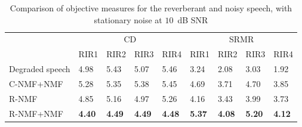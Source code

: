 \begin{table}[htb]
\centering
\caption{Comparison of objective measures for the reverberant and noisy speech, with stationary noise at $10$~dB SNR}
\label{tab:10dB}
\begin{tabular}{|l|l|l|l|l|l|l|l|l|}
\hline
\multirow{2}{*}{} & \multicolumn{4}{c|}{CD}                                       & \multicolumn{4}{c|}{SRMR}                                     \\ \cline{2-9} 
                  & RIR1          & RIR2          & RIR3          & RIR4          & RIR1          & RIR2          & RIR3          & RIR4          \\ \hline
Degraded speech   & 4.98          & 5.43          & 5.07          & 5.46          & 3.24          & 2.08          & 3.03          & 1.92          \\ \hline
C-NMF+NMF~\cite{mohammadiha2016speech,Mohammadiha2015}         & 5.28          & 5.35          & 5.38          & 5.45          & 4.69          & 3.71          & 4.70          & 3.85          \\ \hline
R-NMF             & 4.85          & 5.16          & 4.97          & 5.26          & 4.16          & 3.43          & 3.99          & 3.73          \\ \hline
R-NMF+NMF          & \textbf{4.40} & \textbf{4.49} & \textbf{4.49} & \textbf{4.48} & \textbf{5.37} & \textbf{4.08} & \textbf{5.20} & \textbf{4.12} \\ \hline
\end{tabular}
\end{table}
